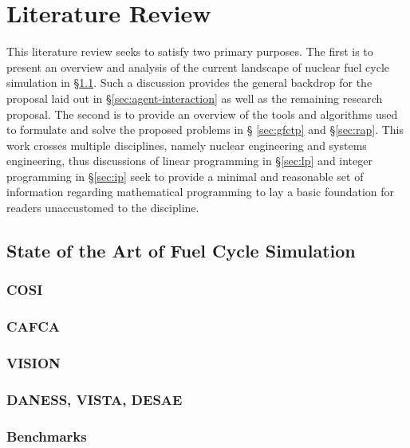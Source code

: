 \chapter{Literature Review}\label{ch:litreview}

This literature review seeks to satisfy two primary purposes. The first is to
present an overview and analysis of the current landscape of nuclear fuel cycle
simulation in \S \ref{sec:simulators}. Such a discussion provides the general
backdrop for the proposal laid out in \S \ref{sec:agent-interaction} as well as
the remaining research proposal. The second is to provide an overview of the
tools and algorithms used to formulate and solve the proposed problems in \S
\ref{sec:gfctp} and \S \ref{sec:rap}. This work crosses multiple disciplines,
namely nuclear engineering and systems engineering, thus discussions of linear
programming in \S \ref{sec:lp} and integer programming in \S \ref{sec:ip} seek
to provide a minimal and reasonable set of information regarding mathematical
programming to lay a basic foundation for readers unaccustomed to the
discipline.

\section{State of the Art of Fuel Cycle Simulation}\label{sec:simulators}


\subsection{COSI}\label{sec:cosi}


\subsection{CAFCA}\label{sec:cafca}


\subsection{VISION}\label{sec:vision}


\subsection{DANESS, VISTA, DESAE}\label{sec:other-sims}


\subsection{Benchmarks}\label{sec:litrev-benchmarks}


